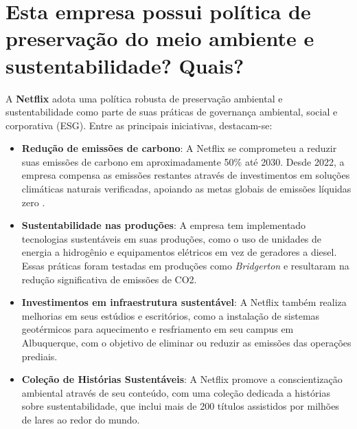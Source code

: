 \section{Esta empresa possui política de preservação do meio ambiente e sustentabilidade? Quais?}

A \textbf{Netflix} adota uma política robusta de preservação ambiental e sustentabilidade como parte de suas práticas de governança ambiental, social e corporativa (ESG). Entre as principais iniciativas, destacam-se:

\begin{itemize}
    \item \textbf{Redução de emissões de carbono}: A Netflix se comprometeu a reduzir suas emissões de carbono em aproximadamente 50\% até 2030. Desde 2022, a empresa compensa as emissões restantes através de investimentos em soluções climáticas naturais verificadas, apoiando as metas globais de emissões líquidas zero \cite{netflix_sustainability}.

    \item \textbf{Sustentabilidade nas produções}: A empresa tem implementado tecnologias sustentáveis em suas produções, como o uso de unidades de energia a hidrogênio e equipamentos elétricos em vez de geradores a diesel. Essas práticas foram testadas em produções como \textit{Bridgerton} e resultaram na redução significativa de emissões de CO2.

    \item \textbf{Investimentos em infraestrutura sustentável}: A Netflix também realiza melhorias em seus estúdios e escritórios, como a instalação de sistemas geotérmicos para aquecimento e resfriamento em seu campus em Albuquerque, com o objetivo de eliminar ou reduzir as emissões das operações prediais.
    
    \item \textbf{Coleção de Histórias Sustentáveis}: A Netflix promove a conscientização ambiental através de seu conteúdo, com uma coleção dedicada a histórias sobre sustentabilidade, que inclui mais de 200 títulos assistidos por milhões de lares ao redor do mundo.

\end{itemize}